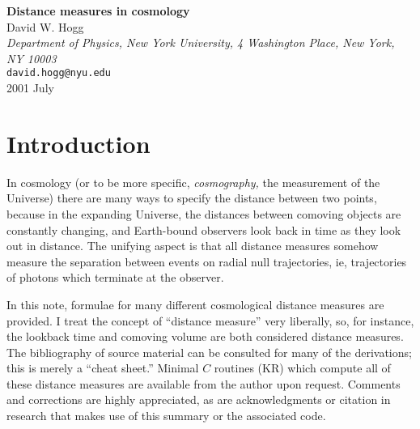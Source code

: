 

\newcommand{\simg}{\raisebox{-0.7ex}{\mbox{$\stackrel{\textstyle >}{\sim}$}}}
\newcommand{\siml}{\raisebox{-0.7ex}{\mbox{$\stackrel{\textstyle <}{\sim}$}}}
\newcommand{\bm}[1]{\mbox{\boldmath $#1$}}
\newenvironment{references}
	{\section{References}\begin{list}{}{
		\topsep=0in
		\partopsep=0in
		\itemsep=0in
		\parsep=0in
		\rightmargin=0in
		\leftmargin=3ex
		\itemindent=-1.0\leftmargin
		\labelsep=0in
		\labelwidth=0in}}
	{\end{list}}



\begin{center}
{\LARGE\bf Distance measures in cosmology} \\[1.0\baselineskip]
{\large\sc David W. Hogg} \\[0.5\baselineskip]
{\normalsize\sl Department of Physics, New York University,
   4 Washington Place, New York, NY 10003} \\
{\normalsize\tt david.hogg@nyu.edu} \\[0.5\baselineskip]
{2001 July}
\end{center}

\section{Introduction}

In cosmology (or to be more specific, {\em cosmography,\/} the
measurement of the Universe) there are many ways to specify the
distance between two points, because in the expanding Universe, the
distances between comoving objects are constantly changing, and
Earth-bound observers look back in time as they look out in distance.
The unifying aspect is that all distance measures somehow measure the
separation between events on radial null trajectories, ie,
trajectories of photons which terminate at the observer.

In this note, formulae for many different cosmological distance
measures are provided.  I treat the concept of ``distance measure''
very liberally, so, for instance, the lookback time and comoving
volume are both considered distance measures.  The bibliography of
source material can be consulted for many of the derivations; this is
merely a ``cheat sheet.''  Minimal $C$ routines (KR) which compute all
of these distance measures are available from the author upon request.
Comments and corrections are highly appreciated, as are
acknowledgments or citation in research that makes use of this summary
or the associated code.


